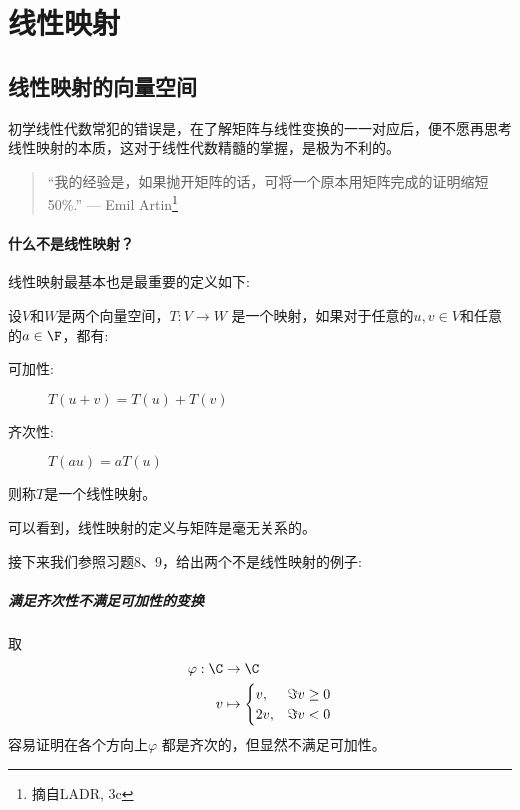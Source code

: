\chapter{线性映射}
\section{线性映射的向量空间}
初学线性代数常犯的错误是，在了解矩阵与线性变换的一一对应后，便不愿再思考线性映射的本质，这对于线性代数精髓的掌握，是极为不利的。
\begin{quote}
    ``我的经验是，如果抛开矩阵的话，可将一个原本用矩阵完成的证明缩短 50\%.''
    \hfill --- Emil Artin\footnote{摘自LADR, 3c}
\end{quote}
\subsubsection{什么不是线性映射？}
线性映射最基本也是最重要的定义如下:
\begin{definition}
    设\(V\)和\(W\)是两个向量空间，\(T: V \to W\) 是一个映射，如果对于任意的\(u,
    v \in V\)和任意的\(a \in \F\)，都有:
    \begin{description}
        \item[可加性:] \(T(u+v)=T(u)+T(v)\)
        \item[齐次性:] \(T(a u) = a T(u)\)
    \end{description}
    则称\(T\)是一个线性映射。
\end{definition}
可以看到，线性映射的定义与矩阵是毫无关系的。

接下来我们参照习题8、9，给出两个不是线性映射的例子:

\paragraph{满足齐次性不满足可加性的变换}
取
\begin{align*}
    \varphi: \C &\to \C \\
    v &\mapsto
    \begin{cases}
        v, &\Im v \geq 0 \\
        2v, &\Im v < 0
    \end{cases}
\end{align*}
容易证明在各个方向上\(\varphi\) 都是齐次的，但显然不满足可加性。

